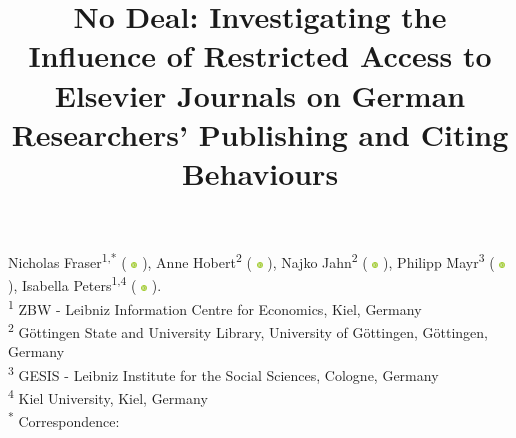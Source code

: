 \title{\vspace{-2em}No Deal: Investigating the Influence of Restricted Access to Elsevier Journals on German Researchers' Publishing and Citing Behaviours\vspace{-3em}}
\date{}

\newcommand{\orcid}{%
  \begingroup\normalfont
  \includegraphics[height=6px]{./assets/orcid_logo.png}%
  \endgroup
}
Nicholas Fraser\textsuperscript{1,*} (\orcid{} \href{https://orcid.org/0000-0002-7582-6339}{\color{black}{0000-0002-7582-6339}}), Anne Hobert\textsuperscript{2} (\orcid{} \href{https://orcid.org/0000-0003-2429-2995}{\color{black}{0000-0003-2429-2995}}), Najko Jahn\textsuperscript{2} (\orcid{} \href{https://orcid.org/0000-0001-5105-1463}{\color{black}{0000-0001-5105-1463}}), Philipp Mayr\textsuperscript{3} (\orcid{} \href{https://orcid.org/0000-0002-6656-1658}{\color{black}{0000-0002-6656-1658}}), Isabella Peters\textsuperscript{1,4} (\orcid{} \href{https://orcid.org/0000-0001-5840-0806}{\color{black}{0000-0001-5840-0806}}). \\

\textsuperscript{1} ZBW - Leibniz Information Centre for Economics, Kiel, Germany \\
\textsuperscript{2} Göttingen State and University Library, University of Göttingen, Göttingen, Germany \\
\textsuperscript{3} GESIS - Leibniz Institute for the Social Sciences, Cologne, Germany \\
\textsuperscript{4} Kiel University, Kiel, Germany \\

\textsuperscript{*} Correspondence: \href{mailto:n.fraser@zbw.eu}{\color{black}{n.fraser@zbw.eu}} 